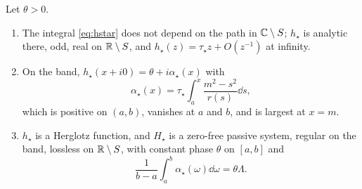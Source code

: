 \begin{theorem}\label{thm:extremal}
Let $\theta>0$.
\begin{enumerate}
\item[(i)] The integral \eqref{eq:hstar} does not depend on the path in
$\mathbb C\setminus S$; $h_\star$ is analytic there, odd, real on $\mathbb R\setminus S$,
and $h_\star(z)=\tau_\star z+O(z^{-1})$ at infinity.
\item[(ii)] On the band, $h_\star(x+i0)=\theta+i\alpha_\star(x)$ with
\begin{equation}\label{eq:alphastar}
\alpha_\star(x)=\tau_\star\int_a^x\frac{m^2-s^2}{r(s)}\dd s ,
\end{equation}
which is positive on $(a,b)$, vanishes at $a$ and $b$, and is largest at
$x=m$.
\item[(iii)] $h_\star$ is a Herglotz function, and $H_\star$ is a zero-free
passive system, regular on the band, lossless on $\mathbb R\setminus S$, with
constant phase $\theta$ on $[a,b]$ and
\[
\frac1{b-a}\int_a^b\alpha_\star(\omega)\dd\omega=\theta\Lambda .
\]
\end{enumerate}
\end{theorem}

